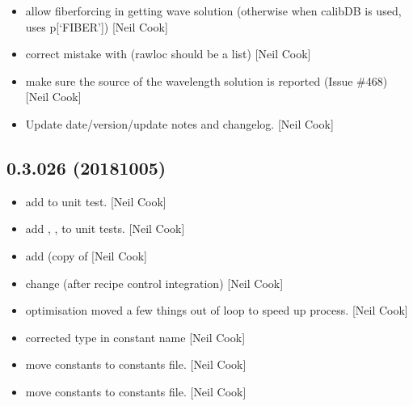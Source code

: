 \documentclass[a4paper,10pt,english]{report}
\begin{document}
\begin{itemize}
\item {} 
 \sphinxhyphen{} allow fiber\sphinxhyphen{}forcing in getting wave solution
(otherwise when calibDB is used, uses p{[}‘FIBER’{]}) {[}Neil Cook{]}

\item {} 
 \sphinxhyphen{} correct mistake with  (rawloc
should be a list) {[}Neil Cook{]}

\item {} 
 \sphinxhyphen{} make sure the source of the wavelength solution is
reported (Issue \#468) {[}Neil Cook{]}

\item {} 
Update date/version/update notes and changelog. {[}Neil Cook{]}

\end{itemize}


\subsection{0.3.026 (2018\sphinxhyphen{}10\sphinxhyphen{}05)}
\label{\detokenize{misc/changelog:id325}}\begin{itemize}
\item {} 
 \sphinxhyphen{} add  to unit test. {[}Neil Cook{]}

\item {} 
 \sphinxhyphen{} add , ,
 to unit tests. {[}Neil Cook{]}

\item {} 
 \sphinxhyphen{} add  (copy of 
{[}Neil Cook{]}

\item {} 
 \sphinxhyphen{} change  (after recipe control
integration) {[}Neil Cook{]}

\item {} 
 \sphinxhyphen{} optimisation \sphinxhyphen{} moved a few things out of loop to
speed up process. {[}Neil Cook{]}

\item {} 
 \sphinxhyphen{} corrected type in constant name
 {[}Neil Cook{]}

\item {} 
 \sphinxhyphen{} move  constants to
constants file. {[}Neil Cook{]}

\item {} 
 \sphinxhyphen{} move constants to constants file. {[}Neil Cook{]}

\end{itemize}
\end{document}
